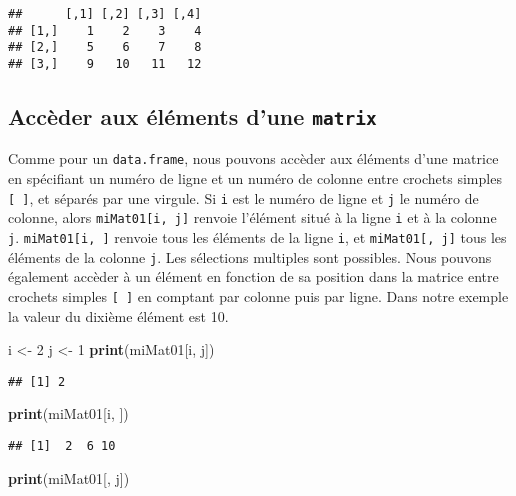 \documentclass[]{book}
\newenvironment{Shaded}{\begin{snugshade}}{\end{snugshade}}
\newcommand{\KeywordTok}[1]{\textcolor[rgb]{0.13,0.29,0.53}{\textbf{#1}}}
\newcommand{\DecValTok}[1]{\textcolor[rgb]{0.00,0.00,0.81}{#1}}
\newcommand{\StringTok}[1]{\textcolor[rgb]{0.31,0.60,0.02}{#1}}
\newcommand{\NormalTok}[1]{#1}
\theoremstyle{definition}
\theoremstyle{definition}
\theoremstyle{definition}
\theoremstyle{remark}
\begin{document}
\begin{verbatim}
##      [,1] [,2] [,3] [,4]
## [1,]    1    2    3    4
## [2,]    5    6    7    8
## [3,]    9   10   11   12
\end{verbatim}

\subsection{\texorpdfstring{Accèder aux éléments d'une
\texttt{matrix}}{Accèder aux éléments d'une matrix}}\label{acceder-aux-elements-dune-matrix}

Comme pour un \texttt{data.frame}, nous pouvons accèder aux éléments
d'une matrice en spécifiant un numéro de ligne et un numéro de colonne
entre crochets simples \texttt{{[}\ {]}}, et séparés par une virgule. Si
\texttt{i} est le numéro de ligne et \texttt{j} le numéro de colonne,
alors \texttt{miMat01{[}i,\ j{]}} renvoie l'élément situé à la ligne
\texttt{i} et à la colonne \texttt{j}. \texttt{miMat01{[}i,\ {]}}
renvoie tous les éléments de la ligne \texttt{i}, et
\texttt{miMat01{[},\ j{]}} tous les éléments de la colonne \texttt{j}.
Les sélections multiples sont possibles. Nous pouvons également accèder
à un élément en fonction de sa position dans la matrice entre crochets
simples \texttt{{[}\ {]}} en comptant par colonne puis par ligne. Dans
notre exemple la valeur du dixième élément est 10.

\begin{Shaded}
\begin{Highlighting}[]
\NormalTok{i <-}\StringTok{ }\DecValTok{2}
\NormalTok{j <-}\StringTok{ }\DecValTok{1}
\KeywordTok{print}\NormalTok{(miMat01[i, j])}
\end{Highlighting}
\end{Shaded}

\begin{verbatim}
## [1] 2
\end{verbatim}

\begin{Shaded}
\begin{Highlighting}[]
\KeywordTok{print}\NormalTok{(miMat01[i, ])}
\end{Highlighting}
\end{Shaded}

\begin{verbatim}
## [1]  2  6 10
\end{verbatim}

\begin{Shaded}
\begin{Highlighting}[]
\KeywordTok{print}\NormalTok{(miMat01[, j])}
\end{Highlighting}
\end{Shaded}
\end{document}
